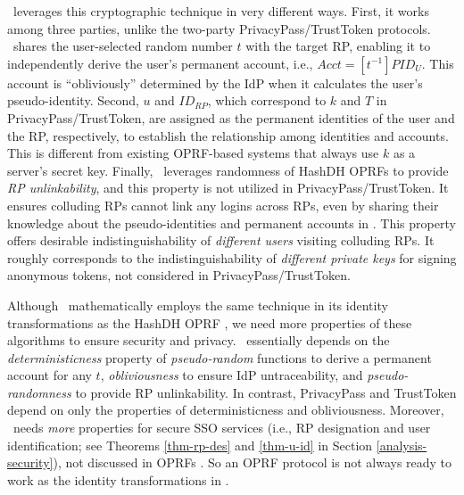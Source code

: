 \usso\ leverages this cryptographic technique in very different ways.
First, 
it works among three parties, unlike the two-party PrivacyPass/TrustToken protocols.
\usso\ shares the user-selected random number $t$ with the target RP,
enabling it to independently derive the user's permanent account, i.e., $Acct = [t^{-1}]PID_{U}$. This account is ``obliviously'' determined by the IdP when it calculates the user's pseudo-identity.
Second, $u$ and $ID_{RP}$, which correspond to $k$ and $T$ in PrivacyPass/TrustToken, are assigned as the permanent identities of the user and the RP, respectively, to establish the relationship among identities and accounts.
This is different from existing OPRF-based systems  \cite{privacypass, trusttoken, strong-oprf, oprf-bitcoin-wallet, pesto, oprf-ot-si, pp-ss, Private-Contact-Discovery, o-kms, oprf-deduplication} that always use $k$ as a server's secret key.
Finally, \usso\ leverages randomness of HashDH OPRFs to provide \emph{RP unlinkability}, and this property is not utilized in PrivacyPass/TrustToken.
It ensures colluding RPs cannot link any logins across RPs,
even by sharing their knowledge about the pseudo-identities and permanent accounts in \usso.
This property offers desirable indistinguishability of \emph{different users} visiting colluding RPs.
It roughly corresponds to the indistinguishability of \emph{different private keys} for signing anonymous tokens, not considered in PrivacyPass/TrustToken. 

Although \usso\ mathematically employs the same technique in its identity transformations as the HashDH OPRF \cite{oprf-proved,voprf-proved}, we need more properties of these algorithms to ensure security and privacy. %
\usso\ essentially 
depends on the \emph{deterministicness} property of \emph{pseudo-random} functions to derive a permanent account for any $t$, \emph{obliviousness} to ensure IdP untraceability, 
and \emph{pseudo-randomness} to provide RP unlinkability. 
In contrast, PrivacyPass and TrustToken \cite{privacypass,trusttoken} depend on only the properties of deterministicness and obliviousness.
Moreover, \usso\ needs \emph{more} properties for secure SSO services (i.e., RP designation and user identification; see Theorems \ref{thm-rp-des} and \ref{thm-u-id}
 in Section \ref{analysis-security}),
    not discussed in OPRFs \cite{sok-oprf,oprf-proved,voprf-proved}.
So an OPRF protocol is not always ready to work as the identity transformations in \usso.

